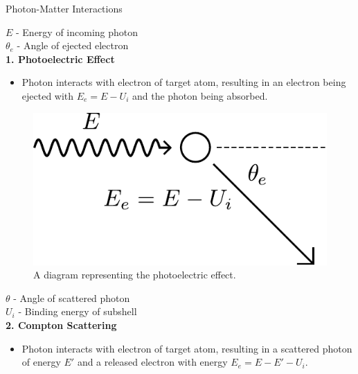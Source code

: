 \documentclass[final]{beamer}
\newlength{\colwidth}
\begin{document}
\begin{frame}[t]
\begin{columns}[t]
\begin{column}{\colwidth}
\begin{block}{Photon-Matter Interactions}
    \begin{multicols}{2}
      \begin{center}
        $E$ - Energy of incoming photon\\
        $\theta_e$ - Angle of ejected electron\\
        \vspace{\baselineskip}
        \textbf{1. Photoelectric Effect}
      \begin{itemize}
        \item Photon interacts with electron of target atom, resulting in an electron being ejected with $E_e = E - U_i$ and the photon being absorbed.
      \end{itemize}
      \end{center}
      \vfill
      \begin{figure}
        \includegraphics[width = 0.4\colwidth]{photoelectric_diagram.pdf}
        \caption{A diagram representing the photoelectric effect.}
      \end{figure}
      \columnbreak%
      \begin{center}
        $\theta$ - Angle of scattered photon \\
        $U_i$ - Binding energy of subshell\\
        \vspace{\baselineskip}
        \textbf{2. Compton Scattering}
      \begin{itemize}
        \item Photon interacts with electron of target atom, resulting in a scattered photon of energy $E'$ and a released electron with energy $E_e = E - E' - U_i$.
      \end{itemize}
      \end{center}
      \vfill
      \begin{figure}

\end{figure}
\end{multicols}
\end{block}
\end{column}
\end{columns}
\end{frame}
\end{document}
